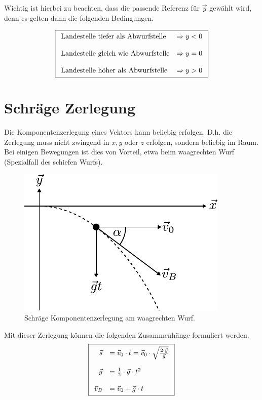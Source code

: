 \noindent
Wichtig ist hierbei zu beachten, dass die passende Referenz für $\vec{y}$
gewählt wird, denn es gelten dann die folgenden Bedingungen.

\[ \boxed{\begin{array}{l l}
	\text{Landestelle tiefer als Abwurfstelle} & \Rightarrow y < 0 \\
	& \\
	\text{Landestelle gleich wie Abwurfstelle} & \Rightarrow y = 0 \\
	& \\
	\text{Landestelle höher als Abwurfstelle} & \Rightarrow y > 0 
\end{array}} \]


\section{Schräge Zerlegung}
Die Komponentenzerlegung eines Vektors kann beliebig erfolgen. 
D.h. die Zerlegung muss nicht zwingend in $x,y$ oder $z$ erfolgen,
sondern beliebig im Raum. Bei einigen Bewegungen ist dies von Vorteil,
etwa beim waagrechten Wurf (Spezialfall des schiefen Wurfs).

\begin{figure}[h!]
	\centering
	\includegraphics[scale=0.8]{wurf2.pdf}
	\caption{Schräge Komponentenzerlegung am waagrechten Wurf.}
	\label{fig:wurf2}
\end{figure}

\noindent
Mit dieser Zerlegung können die folgenden Zusammenhänge formuliert werden.
\[ \boxed{\begin{array}{r l}
	\vec{s} &
		= \vec{v}_0 \cdot t
		= \vec{v}_0 \cdot \sqrt{\frac{2 \cdot \vec{y}}{\vec{g}}} \\
	& \\
	\vec{y} &
		= \frac{1}{2} \cdot \vec{g} \cdot t^2 \\
	& \\
	\vec{v}_B &
		= \vec{v}_0 + \vec{g} \cdot t 
\end{array}}\]

